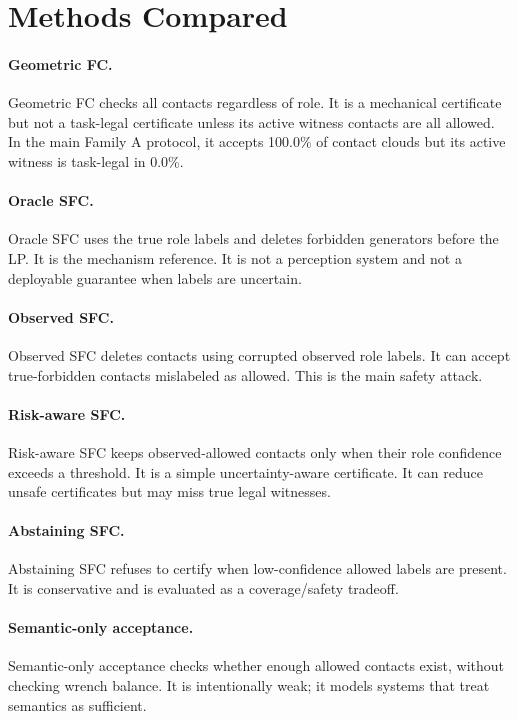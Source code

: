 \documentclass{article}
\begin{document}
\section{Methods Compared}

\paragraph{Geometric FC.}
Geometric FC checks all contacts regardless of role. It is a mechanical certificate but not a task-legal certificate unless its active witness contacts are all allowed. In the main Family A protocol, it accepts 100.0\% of contact clouds but its active witness is task-legal in 0.0\%.

\paragraph{Oracle SFC.}
Oracle SFC uses the true role labels and deletes forbidden generators before the LP. It is the mechanism reference. It is not a perception system and not a deployable guarantee when labels are uncertain.

\paragraph{Observed SFC.}
Observed SFC deletes contacts using corrupted observed role labels. It can accept true-forbidden contacts mislabeled as allowed. This is the main safety attack.

\paragraph{Risk-aware SFC.}
Risk-aware SFC keeps observed-allowed contacts only when their role confidence exceeds a threshold. It is a simple uncertainty-aware certificate. It can reduce unsafe certificates but may miss true legal witnesses.

\paragraph{Abstaining SFC.}
Abstaining SFC refuses to certify when low-confidence allowed labels are present. It is conservative and is evaluated as a coverage/safety tradeoff.

\paragraph{Semantic-only acceptance.}
Semantic-only acceptance checks whether enough allowed contacts exist, without checking wrench balance. It is intentionally weak; it models systems that treat semantics as sufficient.
\end{document}
